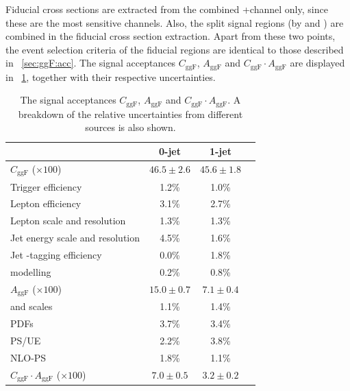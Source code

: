 Fiducial cross sections are extracted from the combined \emch{}+\mech channel only, since 
these are the most sensitive channels. Also, the split signal regions (by \ptsubleadlep and 
\mll) are combined in the fiducial cross section extraction. Apart from these two points, 
the event selection criteria of the fiducial regions are identical to those described in 
\Section~\ref{sec:ggF:acc}. The signal acceptances $C_{\text{ggF}}$, $A_{\text{ggF}}$ and 
$C_{\text{ggF}} \cdot A_{\text{ggF}}$ are displayed in \Table~\ref{tab:ggF:cggF_aggF}, 
together with their respective uncertainties.

\begin{table}[t]
	\begin{tabular}{l@{}c@{\hskip 0.2in}c@{\hskip 0.2in}c}
		\toprule
		& 0-jet & 1-jet & \twojet \\
		\midrule
		$C_{\text{ggF}}$ ($\times 100$) & $46.5\pm2.6$ & $45.6\pm1.8$ &  \\
		\quad Trigger efficiency              & 1.2\% & 1.0\% & \\
		\quad Lepton efficiency               & 3.1\% & 2.7\% & \\
		\quad Lepton \pt scale and resolution & 1.3\% & 1.3\% & \\
		\quad Jet energy scale and resolution & 4.5\% & 1.6\% & \\
		\quad Jet \Pbottom-tagging efficiency & 0.0\% & 1.8\% & \\
		\quad \met modelling                  & 0.2\% & 0.8\% & \\
		\cmidrule(lr){1-4}
		$A_{\text{ggF}}$ ($\times 100$) & $15.0\pm0.7$ & $7.1\pm0.4$ & \\
		\quad \mur and \muf scales & 1.1\% & 1.4\% & \\
		\quad PDFs                 & 3.7\% & 3.4\% & \\
		\quad PS/UE                & 2.2\% & 3.8\% & \\
		\quad NLO-PS               & 1.8\% & 1.1\% & \\
		\cmidrule(lr){1-4}
		$C_{\text{ggF}} \cdot A_{\text{ggF}}$ ($\times 100$) & $7.0\pm0.5$ & $3.2\pm0.2$ & \\
		\bottomrule
	\end{tabular}
	\caption{The signal acceptances $C_{\text{ggF}}$, $A_{\text{ggF}}$ and $C_{\text{ggF}} 
	\cdot A_{\text{ggF}}$. A breakdown of the relative uncertainties from different sources 
	is also shown.}
	\label{tab:ggF:cggF_aggF}
\end{table}

